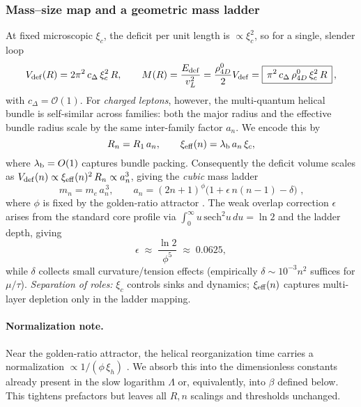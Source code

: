 \subsubsection{Mass--size map and a geometric mass ladder}
At fixed microscopic \(\xi_c\), the deficit per unit length is \( \propto \xi_c^2\), so for a single, slender loop
\begin{equation}
V_{\rm def}(R)=2\pi^2\,c_\Delta\,\xi_c^2\,R,\qquad
M(R)=\frac{E_{\rm def}}{v_L^2}=\frac{\rho_{4D}^0}{2}V_{\rm def}
=\boxed{\,\pi^2\,c_\Delta\,\rho_{4D}^0\,\xi_c^2\,R\,}\,,
\label{eq:MR}
\end{equation}
with \(c_\Delta=\mathcal O(1)\). 
For \emph{charged leptons}, however, the multi-quantum helical bundle is self-similar across families: both the major radius and the effective bundle radius scale by the same inter-family factor \(a_n\). We encode this by
\[
R_n=R_1\,a_n,\qquad \xi_{\rm eff}(n)=\lambda_{\rm b}\,a_n\,\xi_c,
\]
where \(\lambda_{\rm b}=O(1)\) captures bundle packing. Consequently the deficit volume scales as
\(V_{\rm def}(n)\propto \xi_{\rm eff}(n)^2\,R_n\propto a_n^3\), giving the \emph{cubic} mass ladder
\begin{equation}
\boxed{\,m_n=m_e\,a_n^{\,3},\qquad
a_n=(2n+1)^{\phi}\Big(1+\epsilon\,n(n\!-\!1)-\delta\Big)\,}\,,
\label{eq:ladder}
\end{equation}
where \(\phi\) is fixed by the golden-ratio attractor \cite{Norris2025GoldenRatio}. The weak overlap correction \(\epsilon\) arises from the standard core profile via \(\int_0^\infty u\,\mathrm{sech}^2 u\,du=\ln 2\) and the ladder depth, giving
\[
\epsilon\;\approx\;\frac{\ln 2}{\phi^5}\;\approx\;0.0625,
\]
while \(\delta\) collects small curvature/tension effects (empirically \(\delta\sim 10^{-3}n^2\) suffices for \(\mu/\tau\)). 
\emph{Separation of roles:} \(\xi_c\) controls sinks and dynamics; \(\xi_{\rm eff}(n)\) captures multi-layer depletion only in the ladder mapping.

\paragraph*{Normalization note.}
Near the golden-ratio attractor, the helical reorganization time carries a normalization \(\propto 1/(\phi\,\xi_h)\) \cite{Norris2025GoldenRatio}. We absorb this into the dimensionless constants already present in the slow logarithm \(\Lambda\) or, equivalently, into \(\beta\) defined below. This tightens prefactors but leaves all \(R,n\) scalings and thresholds unchanged.

